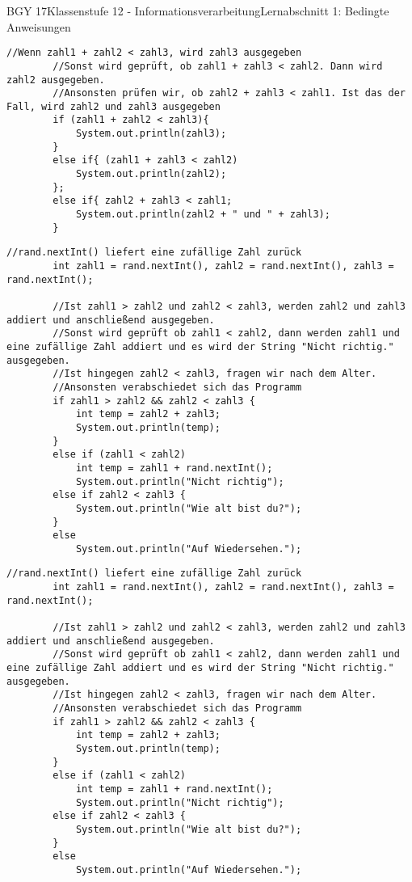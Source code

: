 \documentclass[oneside,openany,headings=optiontotoc,11pt,numbers=noenddot]{scrreprt}
\begin{document}
\begin{worksheet}{BGY 17}{Klassenstufe 12 - Informationsverarbeitung}{Lernabschnitt 1: Bedingte Anweisungen}
\begin{lstlisting}[style=JavaInputStyle]
		//Wenn zahl1 + zahl2 < zahl3, wird zahl3 ausgegeben
		//Sonst wird geprüft, ob zahl1 + zahl3 < zahl2. Dann wird zahl2 ausgegeben.
		//Ansonsten prüfen wir, ob zahl2 + zahl3 < zahl1. Ist das der Fall, wird zahl2 und zahl3 ausgegeben
		if (zahl1 + zahl2 < zahl3){
			System.out.println(zahl3);
		}
		else if{ (zahl1 + zahl3 < zahl2)
			System.out.println(zahl2);
		};
		else if{ zahl2 + zahl3 < zahl1;
			System.out.println(zahl2 + " und " + zahl3);
		}
		\end{lstlisting}
		\newpage
		\begin{lstlisting}[style=JavaInputStyle]
		//rand.nextInt() liefert eine zufällige Zahl zurück
		int zahl1 = rand.nextInt(), zahl2 = rand.nextInt(), zahl3 = rand.nextInt();
		
		//Ist zahl1 > zahl2 und zahl2 < zahl3, werden zahl2 und zahl3 addiert und anschließend ausgegeben.
		//Sonst wird geprüft ob zahl1 < zahl2, dann werden zahl1 und eine zufällige Zahl addiert und es wird der String "Nicht richtig." ausgegeben.
		//Ist hingegen zahl2 < zahl3, fragen wir nach dem Alter.
		//Ansonsten verabschiedet sich das Programm
		if zahl1 > zahl2 && zahl2 < zahl3 {
			int temp = zahl2 + zahl3;
			System.out.println(temp);
		}
		else if (zahl1 < zahl2)
			int temp = zahl1 + rand.nextInt();
			System.out.println("Nicht richtig");
		else if zahl2 < zahl3 {
			System.out.println("Wie alt bist du?");
		}
		else
			System.out.println("Auf Wiedersehen.");
		\end{lstlisting}
		\newpage
		\begin{lstlisting}[style=JavaInputStyle]
		//rand.nextInt() liefert eine zufällige Zahl zurück
		int zahl1 = rand.nextInt(), zahl2 = rand.nextInt(), zahl3 = rand.nextInt();
		
		//Ist zahl1 > zahl2 und zahl2 < zahl3, werden zahl2 und zahl3 addiert und anschließend ausgegeben.
		//Sonst wird geprüft ob zahl1 < zahl2, dann werden zahl1 und eine zufällige Zahl addiert und es wird der String "Nicht richtig." ausgegeben.
		//Ist hingegen zahl2 < zahl3, fragen wir nach dem Alter.
		//Ansonsten verabschiedet sich das Programm
		if zahl1 > zahl2 && zahl2 < zahl3 {
			int temp = zahl2 + zahl3;
			System.out.println(temp);
		}
		else if (zahl1 < zahl2)
			int temp = zahl1 + rand.nextInt();
			System.out.println("Nicht richtig");
		else if zahl2 < zahl3 {
			System.out.println("Wie alt bist du?");
		}
		else
			System.out.println("Auf Wiedersehen.");
		\end{lstlisting}
	\end{worksheet}
\end{document}
